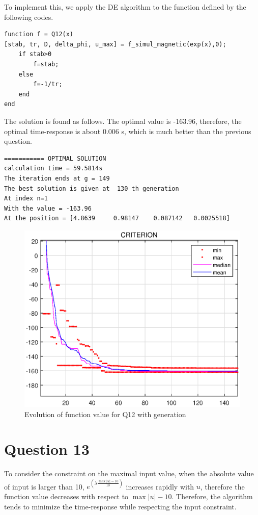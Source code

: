 \documentclass{CSArticle}[english]
\begin{document}
To implement this, we apply the DE algorithm to the function defined by the following codes.

\begin{lstlisting}[style=MATLAB]
function f = Q12(x)
[stab, tr, D, delta_phi, u_max] = f_simul_magnetic(exp(x),0);
    if stab>0
        f=stab;
    else
        f=-1/tr;
    end
end
\end{lstlisting}

The solution is found as follows. The optimal value is -163.96, therefore, the optimal time-response is about $0.006$ s, which is much better than the previous question.

\begin{lstlisting}[style=RESULT,caption={results of Q12}]
=========== OPTIMAL SOLUTION
calculation time = 59.5814s 
The iteration ends at g = 149 
The best solution is given at  130 th generation 
At index n=1 
With the value = -163.96 
At the position = [4.8639     0.98147    0.087142   0.0025518] 
\end{lstlisting}


\begin{figure}[h!]
\centering
\includegraphics[scale=0.6]{figure/Q12.eps}
\caption{Evolution of function value for Q12 with generation}
\label{fig:Q1_pop}
\end{figure}


\section{Question 13}
To consider the constraint on the maximal input value, when the absolute value of input is larger than 10, $e^{\left( \lambda \frac{\max |u|-10}{10} \right)}$ increases rapidly with $u$, therefore the function value decreases with respect to $\max |u|-10$. Therefore, the algorithm tends to minimize the time-response while respecting the input constraint. 
\end{document}
